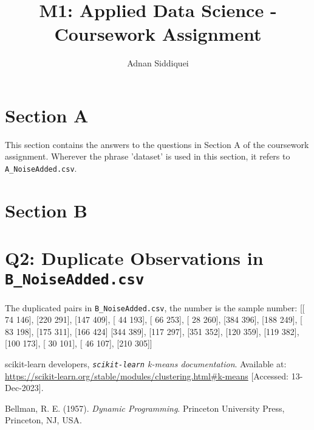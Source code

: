 \documentclass[a4paper,11pt]{article}
\title{\boldmath M1: Applied Data Science - Coursework Assignment}
\author{Adnan Siddiquei}
\affiliation{University of Cambridge}
\newcommand{\inlinecode}[1]{\lstinline{#1}}
\begin{document}
\maketitle
\flushbottom


\section{Section A}\label{sec:section-a}
This section contains the answers to the questions in Section A of the coursework assignment.
Wherever the phrase 'dataset' is used in this section, it refers to \inlinecode{A_NoiseAdded.csv}.




\section{Section B}\label{sec:section-b}

\appendix

\section{Q2: Duplicate Observations in \inlinecode{B_NoiseAdded.csv}}\label{appendix:q2}
The duplicated pairs in \inlinecode{B_NoiseAdded.csv}, the number is the sample number:
[[ 74 146], [220 291], [147 409], [ 44 193], [ 66 253], [ 28 260], [384 396], [188 249], [ 83 198], [175 311], [166 424]
 [344 389], [117 297], [351 352], [120 359], [119 382], [100 173], [ 30 101], [ 46 107], [210 305]]


\begin{thebibliography}{99}

scikit-learn developers,
\textit{\inlinecode{scikit-learn} k-means documentation}.
Available at: \url{https://scikit-learn.org/stable/modules/clustering.html#k-means}
[Accessed: 13-Dec-2023].

Bellman, R. E. (1957).
\textit{Dynamic Programming}.
Princeton University Press, Princeton, NJ, USA.

\end{thebibliography}
\end{document}
